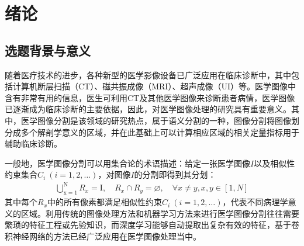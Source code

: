 
\chapter{绪论}
\label{cha:introduction}
\section{选题背景与意义}
\label{sec:background}
随着医疗技术的进步，各种新型的医学影像设备已广泛应用在临床诊断中，其中包括计算机断层扫描（CT）、磁共振成像（MRI）、超声成像（UI）等。医学图像中含有非常有用的信息，医生可利用CT及其他医学图像来诊断患者病情，医学图像已逐渐成为临床诊断的主要依据，因此，对医学图像处理的研究具有重要意义。其中，医学图像分割是该领域的研究热点，属于语义分割的一种，图像分割将图像划分成多个解剖学意义的区域，并在此基础上可以计算相应区域的相关定量指标用于辅助临床诊断。

一般地，医学图像分割可以用集合论的术语描述\cite{liu2021review}：给定一张医学图像$I$以及相似性约束集合$C_i\ (i=1,2,\dots)$，对图像$I$的分割即得到其分划：
\begin{align}
    \bigcup_{\mathrm{x}=1}^{\mathrm{N}} R_{x}=\mathrm{I}, \quad R_{x} \cap R_{y}=\varnothing, \quad \forall x \neq y, x, y \in[1, N]
\end{align}
其中每个$R_x$中的所有像素都满足相似性约束$C_i\ (i=1,2,\dots)$，代表不同病理学意义的区域。利用传统的图像处理方法和机器学习方法来进行医学图像分割往往需要繁琐的特征工程或先验知识，而深度学习能够自动提取出复杂有效的特征，基于卷积神经网络的方法已经广泛应用在医学图像处理当中。

